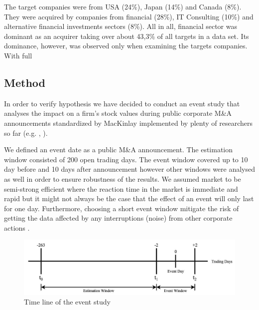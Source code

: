 The target companies were from USA (24\%), Japan (14\%) and Canada (8\%). They were acquired by companies from financial (28\%), IT Consulting (10\%) and alternative financial investments sectors (8\%). All in all, financial sector was dominant as an acquirer taking over about 43,3\% of all targets in a data set. Its dominance, however, was observed only when examining the targets companies. With full




\subsection{Method} 

In order to verify hypothesis we have decided to conduct an event study that analyses the impact on a firm's stock values during public corporate M\&A announcements standardized by MacKinlay \cite{mackinlay1997} implemented by plenty of researchers so far (e.g. \cite{HENDRICKS2003501}, \cite{Fornell2006}).

We defined an event date as a public M\&A announcement. The estimation window consisted of 200 open trading days. The event window covered up to 10 day before and 10 days after announcement however other windows were analysed as well in order to ensure robustness of the results. We assumed market to be semi-strong efficient where the reaction time in the market is immediate and rapid but it might not always be the case that the effect of an event will only last for one day.  Furthermore, choosing a short event window mitigate the risk of getting the data affected by any interruptions (noise) from other corporate actions \cite{LegerYang2005}.

\begin{figure}[h]
  \centering
  \includegraphics[width=\linewidth] {timline event.png}
  \caption{Time line of the event study}
  \label{Fig1}
\end{figure}


